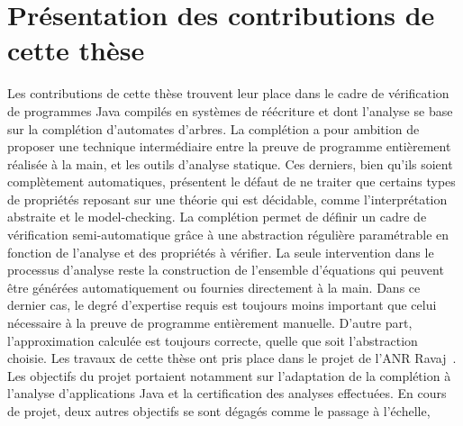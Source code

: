 \section{Présentation des contributions de cette thèse}
Les contributions de cette thèse trouvent leur place dans le cadre de vérification de programmes Java
compilés en systèmes de réécriture et dont l'analyse se base sur la complétion d'automates d'arbres.
La complétion a pour ambition de proposer une technique intermédiaire entre la preuve de programme
entièrement réalisée à la main, et les outils d'analyse statique.
Ces derniers, bien qu'ils soient complètement automatiques, présentent le défaut de ne traiter que 
certains types de propriétés reposant sur une théorie qui est décidable, comme l'interprétation abstraite et le model-checking.
La complétion permet de définir un cadre de vérification semi-automatique grâce à une abstraction
régulière paramétrable en fonction de l'analyse et des propriétés à vérifier.
La seule intervention dans le processus d'analyse reste la construction de l'ensemble d'équations
qui peuvent être générées automatiquement ou fournies directement à la main. Dans ce dernier cas, 
le degré d'expertise requis est toujours moins important que celui nécessaire à la preuve de programme
entièrement manuelle. D'autre part, l'approximation calculée est toujours correcte, quelle que soit l'abstraction choisie.
Les travaux de cette thèse ont pris place dans le projet de l'ANR Ravaj~\cite{RAVAJ}.
Les objectifs du projet portaient notamment sur l'adaptation de la complétion à l'analyse d'applications Java
et la certification des analyses effectuées. 
En cours de projet, deux autres objectifs se sont dégagés comme le passage à l'échelle,
